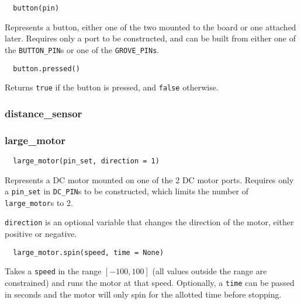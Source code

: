 \documentclass[12pt]{scrartcl} %
\begin{document}
\begin{verbatim}
  button(pin)
\end{verbatim}

Represents a button, either one of the two mounted to the board or one attached
later. Requires only a port to be constructed, and can be built from either one
of the \texttt{BUTTON_PIN}s or one of the
\texttt{GROVE_PINs}.

\begin{verbatim}
  button.pressed()
\end{verbatim}

Returns \texttt{true} if the button is pressed, and
\texttt{false} otherwise.

\subsubsection{distance\_sensor}

\subsubsection{large\_motor}

\begin{verbatim}
  large_motor(pin_set, direction = 1)
\end{verbatim}

Represents a DC motor mounted on one of the 2 DC motor ports. Requires only a
\texttt{pin_set} in \texttt{DC_PIN}s to be constructed,
which limits the number of \texttt{large_motor}s to 2.

\texttt{direction} is an optional variable that changes the
direction of the motor, either positive or negative.

\begin{verbatim}
  large_motor.spin(speed, time = None)
\end{verbatim}

Takes a \texttt{speed} in the range $[-100, 100]$ (all values
outside the range are constrained) and runs the motor at that speed.
Optionally, a \texttt{time} can be passed in seconds and the motor
will only spin for the allotted time before stopping.
\end{document}
